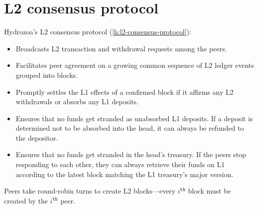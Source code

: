 \documentclass[../hydrozoa.tex]{subfiles}
\begin{document}
\section*{L2 consensus protocol}%
\label{h:overview-l2-consensus-protocol}%
%

Hydrozoa's L2 consensus protocol (\cref{h:l2-consensus-protocol}):
\begin{itemize}
  \item Broadcasts L2 transaction and withdrawal requests among the peers.
  \item Facilitates peer agreement on a growing common sequence of L2 ledger events grouped into blocks.
  \item Promptly settles the L1 effects of a confirmed block if it affirms any L2 withdrawals or absorbs any L1 deposits.
  \item Ensures that no funds get stranded as unabsorbed L1 deposits.
  If a deposit is determined not to be absorbed into the head, it can always be refunded to the depositor.
  \item Ensures that no funds get stranded in the head's treasury.
  If the peers stop responding to each other, they can always retrieve their funds on L1 according to the latest block matching the L1 treasury's major version.
\end{itemize}

Peers take round-robin turns to create L2 blocks---every $i^\mathtt{th}$ block must be created by the  $i^\mathtt{th}$ peer.
\end{document}
